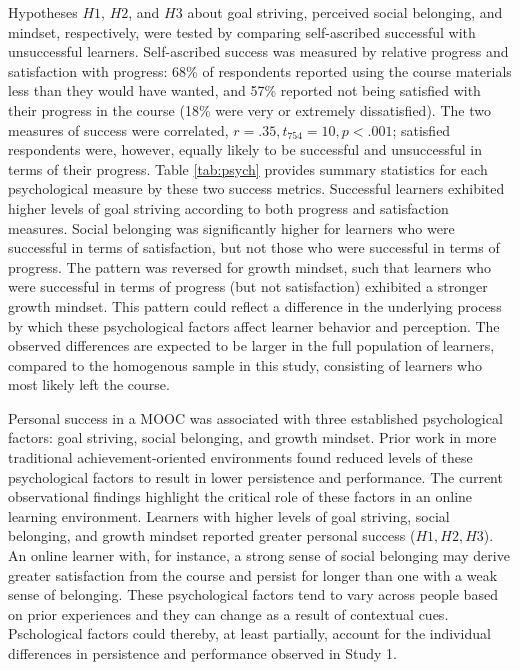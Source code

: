 \documentclass{sigchi}\usepackage[]{graphicx}\usepackage[]{color}
\begin{document}
Hypotheses $H1$, $H2$, and $H3$ about goal striving, perceived social belonging, and mindset, respectively, were tested by comparing self-ascribed successful with unsuccessful learners. Self-ascribed success was measured by relative progress and satisfaction with progress: 68\% of respondents reported using the course materials less than they would have wanted, and 57\% reported not being satisfied with their progress in the course (18\% were very or extremely dissatisfied). The two measures of success were correlated, $r=.35, t_{754}=10, p<.001$; satisfied respondents were, however, equally likely to be successful and unsuccessful in terms of their progress. Table \ref{tab:psych} provides summary statistics for each psychological measure by these two success metrics. Successful learners exhibited higher levels of goal striving according to both progress and satisfaction measures. Social belonging was significantly higher for learners who were successful in terms of satisfaction, but not those who were successful in terms of progress. The pattern was reversed for growth mindset, such that learners who were successful in terms of progress (but not satisfaction) exhibited a stronger growth mindset. This pattern could reflect a difference in the underlying process by which these psychological factors affect learner behavior and perception. The observed differences are expected to be larger in the full population of learners, compared to the homogenous sample in this study, consisting of learners who most likely left the course.

Personal success in a MOOC was associated with three established psychological factors: goal striving, social belonging, and growth mindset. Prior work in more traditional achievement-oriented environments found reduced levels of these psychological factors to result in lower persistence and performance. The current observational findings highlight the critical role of these factors in an online learning environment. Learners with higher levels of goal striving, social belonging, and growth mindset reported greater personal success ($H1,H2,H3$). An online learner with, for instance, a strong sense of social belonging may derive greater satisfaction from the course and persist for longer than one with a weak sense of belonging. These psychological factors tend to vary across people based on prior experiences and they can change as a result of contextual cues. Pschological factors could thereby, at least partially, account for the individual differences in persistence and performance observed in Study 1.
\end{document}
